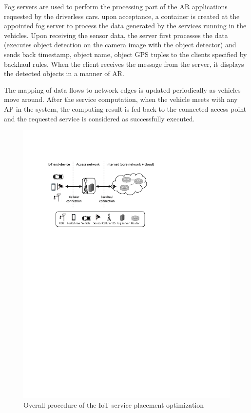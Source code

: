 \documentclass[twocolumn]{article}
\begin{document}
\par Fog servers are used to perform the processing part of the AR applications requested by the driverless cars. upon acceptance, a container is created at the appointed fog server to process the data generated by the services running in the vehicles. Upon receiving the sensor data, the server first processes the data (executes object detection on the camera image with the object detector) and sends back {timestamp, object name, object GPS} tuples to the clients specified by backhaul rules. When the client receives the message from the server, it displays the detected objects in a manner of AR. 

\par The mapping of data flows to network edges is updated periodically as vehicles move around. After the service computation, when the vehicle meets with any AP in the system, the computing result is fed back to the connected access point and the requested service is considered as successfully executed.

\begin{figure}[!htbp]
\centering
\includegraphics[clip, trim=2.5cm 17.6cm 7.8cm 3.1cm, width=\columnwidth]{figures/pdf/fig1-iot-Arch.pdf}
\caption{Overall procedure of the IoT service placement optimization}
\label{fig:system}
\end{figure}
\end{document}
